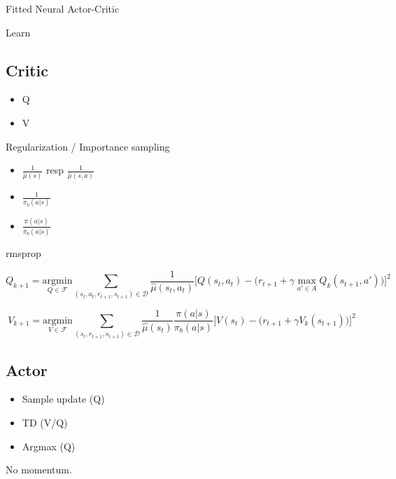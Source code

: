 Fitted Neural Actor-Critic

Learn
\subsection{Critic}
\begin{itemize}
 \item Q
 \item V
\end{itemize}

Regularization / Importance sampling
\begin{itemize}
 \item $\frac{1}{\hat{\mu}(s)}$ resp $\frac{1}{\hat{\mu}(s,a)}$
 \item $\frac{1}{\pi_b(a|s)}$
 \item $\frac{\pi(a|s)}{\pi_b(a|s)}$
\end{itemize}

rmsprop

\begin{equation}
 Q_{k+1} = \underset{Q \in \mathcal{F}}{\text{argmin}} 
 \sum_{ (s_t, a_t,r_{t+1}, s_{t+1}) \in \mathcal{D}} 
 \frac{1}{\hat{\mu}(s_t,a_t)}
 \Big[ Q(s_t, a_t) - \big( r_{t+1} + \gamma \underset{a' \in A}{\text{ max }} Q_k(s_{t+1}, a') \big) \Big]^2
\end{equation}

\begin{equation}
 V_{k+1} = \underset{V \in \mathcal{F}}{\text{argmin}} 
 \sum_{ (s_t, r_{t+1}, s_{t+1}) \in \mathcal{D}}
 \frac{1}{\hat{\mu}(s_t)} \frac{\pi(a|s)}{\pi_b(a|s)}
 \Big[ V(s_t) - \big( r_{t+1} + \gamma V_k(s_{t+1}) \big) \Big]^2
\end{equation}

\subsection{Actor}

\begin{itemize}
 \item Sample update (Q)
 \item TD (V/Q)
 \item Argmax (Q)
\end{itemize}

No momentum.


